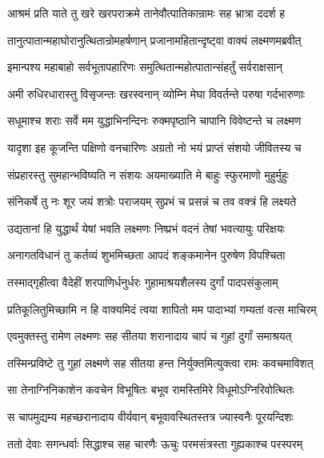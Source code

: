
\twolineshloka
{आश्रमं प्रति याते तु खरे खरपराक्रमे}
{तानेवौत्पातिकान्रामः सह भ्रात्रा ददर्श ह} %

\twolineshloka
{तानुत्पातान्महाघोरानुत्थितान्रोमहर्षणान्}
{प्रजानामहितान्दृष्ट्वा वाक्यं लक्ष्मणमब्रवीत्} %

\twolineshloka
{इमान्पश्य महाबाहो सर्वभूतापहारिणः}
{समुत्थितान्महोत्पातान्संहर्तुं सर्वराक्षसान्} %

\twolineshloka
{अमी रुधिरधारास्तु विसृजन्तः खरस्वनान्}
{व्योम्नि मेघा विवर्तन्ते परुषा गर्दभारुणाः} %

\twolineshloka
{सधूमाश्च शराः सर्वे मम युद्धाभिनन्दिनः}
{रुक्मपृष्ठानि चापानि विवेष्टन्ते च लक्ष्मण} %

\twolineshloka
{यादृशा इह कूजन्ति पक्षिणो वनचारिणः}
{अग्रतो नो भयं प्राप्तं संशयो जीवितस्य च} %

\twolineshloka
{संप्रहारस्तु सुमहान्भविष्यति न संशयः}
{अयमाख्याति मे बाहुः स्फुरमाणो मुहुर्मुहुः} %

\twolineshloka
{संनिकर्षे तु नः शूर जयं शत्रोः पराजयम्}
{सुप्रभं च प्रसन्नं च तव वक्त्रं हि लक्ष्यते} %

\twolineshloka
{उद्यतानां हि युद्धार्थं येषां भवति लक्ष्मणः}
{निष्प्रभं वदनं तेषां भवत्यायुः परिक्षयः} %

\twolineshloka
{अनागतविधानं तु कर्तव्यं शुभमिच्छता}
{आपदं शङ्कमानेन पुरुषेण विपश्चिता} %

\twolineshloka
{तस्माद्गृहीत्वा वैदेहीं शरपाणिर्धनुर्धरः}
{गुहामाश्रयशैलस्य दुर्गां पादपसंकुलाम्} %

\twolineshloka
{प्रतिकूलितुमिच्छामि न हि वाक्यमिदं त्वया}
{शापितो मम पादाभ्यां गम्यतां वत्स माचिरम्} %

\twolineshloka
{एवमुक्तस्तु रामेण लक्ष्मणः सह सीतया}
{शरानादाय चापं च गुहां दुर्गां समाश्रयत्} %

\twolineshloka
{तस्मिन्प्रविष्टे तु गुहां लक्ष्मणे सह सीतया}
{हन्त निर्युक्तमित्युक्त्वा रामः कवचमाविशत्} %

\twolineshloka
{सा तेनाग्निनिकाशेन कवचेन विभूषितः}
{बभूव रामस्तिमिरे विधूमोऽग्निरिवोत्थितः} %

\twolineshloka
{स चापमुद्यम्य महच्छरानादाय वीर्यवान्}
{बभूवावस्थितस्तत्र ज्यास्वनैः पूरयन्दिशः} %

\twolineshloka
{ततो देवाः सगन्धर्वाः सिद्धाश्च सह चारणैः}
{ऊचुः परमसंत्रस्ता गुह्यकाश्च परस्परम्} %

